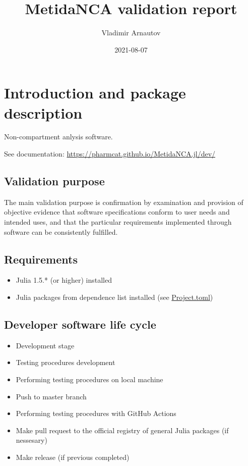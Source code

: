 \documentclass[12pt,a4paper]{article}
\title{ MetidaNCA validation report }
\author{ Vladimir Arnautov }
\date{ 2021-08-07 }
\begin{document}
\maketitle


\section{Introduction and package description}
Non-compartment anlysis software.

See documentation: \href{https://pharmcat.github.io/MetidaNCA.jl/dev/}{https://pharmcat.github.io/MetidaNCA.jl/dev/}

\subsection{Validation purpose}
The main validation purpose is confirmation by examination and provision of objective evidence that software specifications conform to user needs and intended uses, and that the particular requirements implemented through software can be consistently fulfilled.

\subsection{Requirements}
\begin{itemize}
\item Julia 1.5.* (or higher) installed


\item Julia packages from dependence list installed (see \href{https://github.com/PharmCat/MetidaNCA.jl/blob/main/Project.toml}{Project.toml})

\end{itemize}
\subsection{Developer software life cycle}
\begin{itemize}
\item Development stage


\item Testing procedures development


\item Performing testing procedures on local machine


\item Push to master branch


\item Performing testing procedures with GitHub Actions


\item Make pull request to the official registry of general Julia packages (if nessesary)


\item Make release (if previous completed)

\end{itemize}
\end{document}
